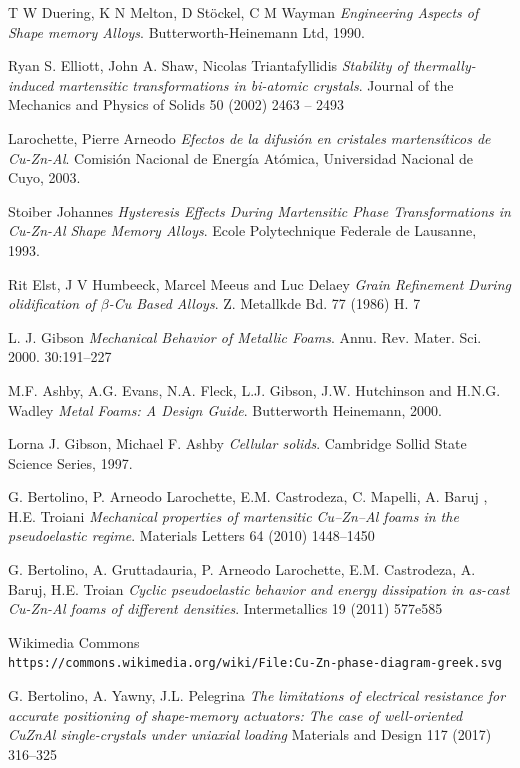 \documentclass[a4paper,12pt,fleqn,twoside,openany]{book}
\begin{document}
\begin{thebibliography}{3}

T W Duering, K N Melton, D St{\"o}ckel, C M Wayman 
\textit{Engineering Aspects of Shape memory Alloys}. 
Butterworth-Heinemann Ltd, 1990.
 
Ryan S. Elliott, John A. Shaw, Nicolas Triantafyllidis
\textit{Stability of thermally-induced martensitic
transformations in bi-atomic crystals}.
Journal of the Mechanics and Physics of Solids
50 (2002) 2463 – 2493

Larochette, Pierre Arneodo 
\textit{Efectos de la difusión en cristales martensíticos de Cu-Zn-Al}. 
Comisión Nacional de Energía Atómica, Universidad Nacional de Cuyo, 2003.

Stoiber Johannes 
\textit{Hysteresis Effects During Martensitic Phase Transformations in Cu-Zn-Al Shape Memory Alloys}. 
Ecole Polytechnique Federale de Lausanne, 1993.

Rit Elst, J V Humbeeck, Marcel Meeus and Luc Delaey
\textit{Grain Refinement During olidification of $\beta$-Cu Based Alloys}.
Z. Metallkde Bd. 77 (1986) H. 7

L. J. Gibson
\textit{Mechanical Behavior of Metallic Foams}.
Annu. Rev. Mater. Sci. 2000. 30:191–227

M.F. Ashby, A.G. Evans, N.A. Fleck, L.J. Gibson,
J.W. Hutchinson and H.N.G. Wadley
\textit{Metal Foams: A Design Guide}. 
Butterworth Heinemann, 2000.


Lorna J. Gibson, Michael F. Ashby  
\textit{Cellular solids}. 
Cambridge Sollid State Science Series, 1997.

G. Bertolino, P. Arneodo Larochette, E.M. Castrodeza, C. Mapelli, A. Baruj , H.E. Troiani
\textit{Mechanical properties of martensitic Cu–Zn–Al foams in the pseudoelastic regime}.
Materials Letters 64 (2010) 1448–1450

G. Bertolino, A. Gruttadauria, P. Arneodo Larochette, E.M. Castrodeza, A. Baruj, H.E. Troian
\textit{Cyclic pseudoelastic behavior and energy dissipation in as-cast Cu-Zn-Al foams of
different densities}.
Intermetallics 19 (2011) 577e585

Wikimedia Commons
\\\texttt{https://commons.wikimedia.org/wiki/File:Cu-Zn-phase-diagram-greek.svg}


G. Bertolino, A. Yawny, J.L. Pelegrina
\textit{The limitations of electrical resistance for accurate positioning of
shape-memory actuators: The case of well-oriented CuZnAl
single-crystals under uniaxial loading}
Materials and Design 117 (2017) 316–325
\end{thebibliography}
\end{document}
